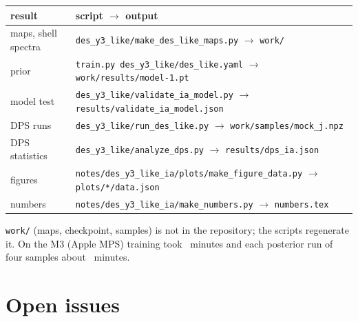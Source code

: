 \documentclass[11pt]{article}
\begin{document}
\begin{center}
  \footnotesize
  \begin{tabular}{ll}
    \toprule
    result & script $\rightarrow$ output \\
    \midrule
    maps, shell spectra & \texttt{des\_y3\_like/make\_des\_like\_maps.py} $\rightarrow$ \texttt{work/} \\
    prior & \texttt{train.py des\_y3\_like/des\_like.yaml} $\rightarrow$ \texttt{work/results/model-1.pt} \\
    model test & \texttt{des\_y3\_like/validate\_ia\_model.py} $\rightarrow$ \texttt{results/validate\_ia\_model.json} \\
    DPS runs & \texttt{des\_y3\_like/run\_des\_like.py} $\rightarrow$ \texttt{work/samples/mock\_j.npz} \\
    DPS statistics & \texttt{des\_y3\_like/analyze\_dps.py} $\rightarrow$ \texttt{results/dps\_ia.json} \\
    figures & \texttt{notes/des\_y3\_like\_ia/plots/make\_figure\_data.py} $\rightarrow$ \texttt{plots/*/data.json} \\
    numbers & \texttt{notes/des\_y3\_like\_ia/make\_numbers.py} $\rightarrow$ \texttt{numbers.tex} \\
    \bottomrule
  \end{tabular}
\end{center}

\texttt{work/} (maps, checkpoint, samples) is not in the repository; the scripts regenerate it.
On the M3 (Apple MPS) training took \TrainMinutes\ minutes and each posterior run of four
samples about \SampleMinutes\ minutes.

\section{Open issues}
\label{app:open}
\end{document}
